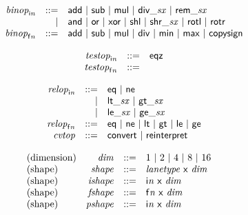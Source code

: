 $$
\begin{array}{@{}lrrl@{}l@{}}
& {{\mathit{binop}}}_{{\mathsf{i}}{{\mathit{n}}}} &::=& \mathsf{add} ~|~ \mathsf{sub} ~|~ \mathsf{mul} ~|~ {\mathsf{div\_}}{{\mathit{sx}}} ~|~ {\mathsf{rem\_}}{{\mathit{sx}}} \\ &&|&
\mathsf{and} ~|~ \mathsf{or} ~|~ \mathsf{xor} ~|~ \mathsf{shl} ~|~ {\mathsf{shr\_}}{{\mathit{sx}}} ~|~ \mathsf{rotl} ~|~ \mathsf{rotr} \\
& {{\mathit{binop}}}_{{\mathsf{f}}{{\mathit{n}}}} &::=& \mathsf{add} ~|~ \mathsf{sub} ~|~ \mathsf{mul} ~|~ \mathsf{div} ~|~ \mathsf{min} ~|~ \mathsf{max} ~|~ \mathsf{copysign} \\
\end{array}
$$

$$
\begin{array}{@{}lrrl@{}l@{}}
& {{\mathit{testop}}}_{{\mathsf{i}}{{\mathit{n}}}} &::=& \mathsf{eqz} \\
& {{\mathit{testop}}}_{{\mathsf{f}}{{\mathit{n}}}} &::=&  \\
\end{array}
$$

$$
\begin{array}{@{}lrrl@{}l@{}}
& {{\mathit{relop}}}_{{\mathsf{i}}{{\mathit{n}}}} &::=& \mathsf{eq} ~|~ \mathsf{ne} \\ &&|&
{\mathsf{lt\_}}{{\mathit{sx}}} ~|~ {\mathsf{gt\_}}{{\mathit{sx}}} \\ &&|&
{\mathsf{le\_}}{{\mathit{sx}}} ~|~ {\mathsf{ge\_}}{{\mathit{sx}}} \\
& {{\mathit{relop}}}_{{\mathsf{f}}{{\mathit{n}}}} &::=& \mathsf{eq} ~|~ \mathsf{ne} ~|~ \mathsf{lt} ~|~ \mathsf{gt} ~|~ \mathsf{le} ~|~ \mathsf{ge} \\
& {\mathit{cvtop}} &::=& \mathsf{convert} ~|~ \mathsf{reinterpret} \\
\end{array}
$$

\vspace{1ex}

$$
\begin{array}{@{}lrrl@{}l@{}}
\mbox{(dimension)} & {\mathit{dim}} &::=& 1 ~|~ 2 ~|~ 4 ~|~ 8 ~|~ 16 \\
\mbox{(shape)} & {\mathit{shape}} &::=& {\mathit{lanetype}}~\mathsf{x}~{\mathit{dim}} \\
\mbox{(shape)} & {\mathit{ishape}} &::=& {\mathsf{i}}{{\mathit{n}}}~\mathsf{x}~{\mathit{dim}} \\
\mbox{(shape)} & {\mathit{fshape}} &::=& {\mathsf{f}}{{\mathit{n}}}~\mathsf{x}~{\mathit{dim}} \\
\mbox{(shape)} & {\mathit{pshape}} &::=& {\mathsf{i}}{{\mathit{n}}}~\mathsf{x}~{\mathit{dim}} \\
\end{array}
$$

